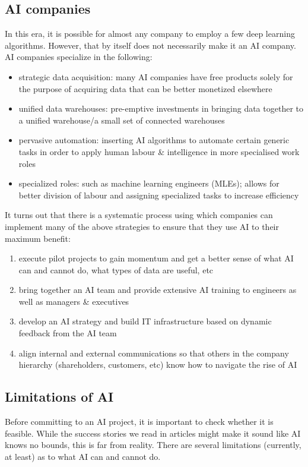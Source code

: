 \documentclass{article}[a4paper,12pt]
\theoremstyle{definition}
\begin{document}
\subsection{AI companies}
In this era, it is possible for almost any company to employ a few deep learning algorithms. However, that by itself does not necessarily make it an AI company. AI companies specialize in the following:
\begin{itemize}
	\item strategic data acquisition: many AI companies have free products solely for the purpose of acquiring data that can be better monetized elsewhere
	\item unified data warehouses: pre-emptive investments in bringing data together to a unified warehouse/a small set of connected warehouses 
	\item pervasive automation: inserting AI algorithms to automate certain generic tasks in order to apply human labour \& intelligence in more specialised work roles
	\item specialized roles: such as machine learning engineers (MLEs); allows for better division of labour and assigning specialized tasks to increase efficiency
\end{itemize}
It turns out that there is a systematic process using which companies can implement many of the above strategies to ensure that they use AI to their maximum benefit:
\begin{enumerate}
	\item execute pilot projects to gain momentum and get a better sense of what AI can and cannot do, what types of data are useful, etc
	\item bring together an AI team and provide extensive AI training to engineers as well as managers \& executives
	\item develop an AI strategy and build IT infrastructure based on dynamic feedback from the AI team
	\item align internal and external communications so that others in the company hierarchy (shareholders, customers, etc) know how to navigate the rise of AI
\end{enumerate}
\subsection{Limitations of AI}
Before committing to an AI project, it is important to check whether it is feasible. While the success stories we read in articles might make it sound like AI knows no bounds, this is far from reality. There are several limitations (currently, at least) as to what AI can and cannot do.
\vspace{6pt}
\end{document}
